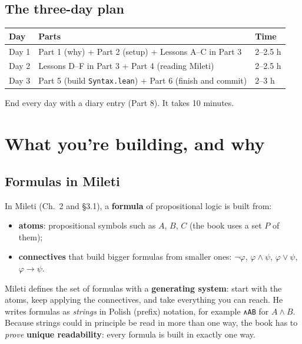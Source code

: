 \documentclass[11pt,a4paper]{article}
\newcommand{\code}[1]{\texttt{#1}}
\begin{document}
\subsection{The three-day plan}\label{plan}
\begin{center}
\begin{tabularx}{\linewidth}{@{}l>{\raggedright\arraybackslash}Xl@{}}
\toprule
\textbf{Day} & \textbf{Parts} & \textbf{Time}\\
\midrule
Day 1 & Part 1 (why) + Part 2 (setup) + Lessons A--C in Part 3 & 2--2.5 h\\
Day 2 & Lessons D--F in Part 3 + Part 4 (reading Mileti) & 2--2.5 h\\
Day 3 & Part 5 (build \code{Syntax.lean}) + Part 6 (finish and commit) & 2--3 h\\
\bottomrule
\end{tabularx}
\end{center}
End every day with a diary entry (Part 8). It takes 10 minutes.

\section{What you're building, and why}

\subsection{Formulas in Mileti}
In Mileti (Ch.~2 and §3.1), a \textbf{formula} of propositional logic is built from:
\begin{itemize}
\item \textbf{atoms}: propositional symbols such as $A$, $B$, $C$ (the book uses a set $P$ of them);
\item \textbf{connectives} that build bigger formulas from smaller ones: $\neg\varphi$, $\varphi\wedge\psi$, $\varphi\vee\psi$, $\varphi\to\psi$.
\end{itemize}
Mileti defines the set of formulas with a \textbf{generating system}: start with the atoms, keep applying the connectives, and take everything you can reach. He writes formulas as \emph{strings} in Polish (prefix) notation, for example \code{∧AB} for $A\wedge B$. Because strings could in principle be read in more than one way, the book has to \emph{prove} \textbf{unique readability}: every formula is built in exactly one way.
\end{document}
